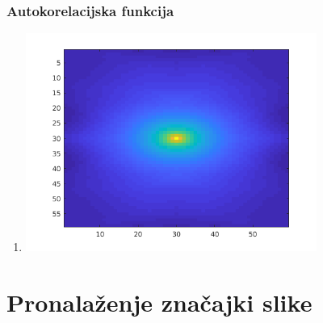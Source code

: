 \documentclass[12pt, a4]{report}
\begin{document}
\subsection{Autokorelacijska funkcija}
\begin{enumerate}
	\item
	      \begin{minipage}{\linewidth}
		      \centering
		      \includegraphics[width=0.75\textwidth]{akfgauss}
	      \end{minipage}


\end{enumerate}

\chapter{Pronalaženje značajki slike}
\end{document}
